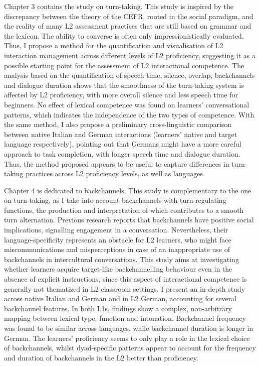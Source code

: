 \begin{styleStandard}
Chapter 3 contains the study on turn-taking. This study is inspired by the discrepancy between the theory of the CEFR, rooted in the social paradigm, and the reality of many L2 assessment practices that are still based on grammar and the lexicon. The ability to converse is often only impressionistically evaluated. Thus, I propose a method for the quantification and visualisation of L2 interaction management across different levels of L2 proficiency, suggesting it as a possible starting point for the assessment of L2 interactional competence. The analysis based on the quantification of speech time, silence, overlap, backchannels and dialogue duration shows that the smoothness of the turn-taking system is affected by L2 proficiency, with more overall silence and less speech time for beginners. No effect of lexical competence was found on learners’ conversational patterns, which indicates the independence of the two types of competence. With the same method, I also propose a preliminary cross-linguistic comparison between native Italian and German interactions (learners’ native and target language respectively), pointing out that Germans might have a more careful approach to task completion, with longer speech time and dialogue duration. Thus, the method proposed appears to be useful to capture differences in turn-taking practices across L2 proficiency levels, as well as languages.
\end{styleStandard}

\begin{styleStandard}
Chapter 4 is dedicated to backchannels. This study is complementary to the one on turn-taking, as I take into account backchannels with turn-regulating functions, the production and interpretation of which contributes to a smooth turn alternation. Previous research reports that backchannels have positive social implications, signalling engagement in a conversation. Nevertheless, their language-specificity represents an obstacle for L2 learners, who might face miscommunications and misperceptions in case of an inappropriate use of backchannels in intercultural conversations. This study aims at investigating whether learners acquire target-like backchannelling behaviour even in the absence of explicit instructions, since this aspect of interactional competence is generally not thematized in L2 classroom settings. I present an in-depth study across native Italian and German and in L2 German, accounting for several backchannel features. In both L1s, findings show a complex, non-arbitrary mapping between lexical type, function and intonation. Backchannel frequency was found to be similar across languages, while backchannel duration is longer in German. The learners’ proficiency seems to only play a role in the lexical choice of backchannels, whilst dyad-specific patterns appear to account for the frequency and duration of backchannels in the L2 better than proficiency.
\end{styleStandard}

